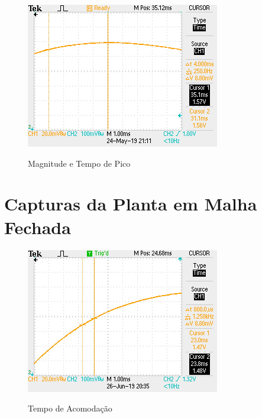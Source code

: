 \documentclass[
	12pt,				%
	article,			%
	openright,			%
	oneside,
	a4paper,			%
	chapter=TITLE,		%
	section=TITLE,		%
	english,			%
	french,				%
	spanish,			%
	brazil,				%
]{abntex2}
\begin{document}
\begin{apendicesenv}
        	\begin{figure}[htbp]
            	\centering
            	\caption{Magnitude e Tempo de Pico}
            	\includegraphics[width=\textwidth,height=240px,keepaspectratio]{imgs/ftma/overshoot.JPG}
            	\label{fig-ftma-overshoot}
        	\end{figure}
        	\FloatBarrier
        	
        	\clearpage
        	
        \chapter{Capturas da Planta em Malha Fechada}
        	\label{ap-ftmf}
        	
        	\FloatBarrier
        		
        	\begin{figure}[htbp]
            	\centering
            	\caption{Tempo de Acomodação}
            	\includegraphics[width=\textwidth,height=240px,keepaspectratio]{imgs/ftmf/settling_time.JPG}
            	\label{fig-ftmf-settling_time}
        	\end{figure}
        

\end{apendicesenv}
\end{document}
